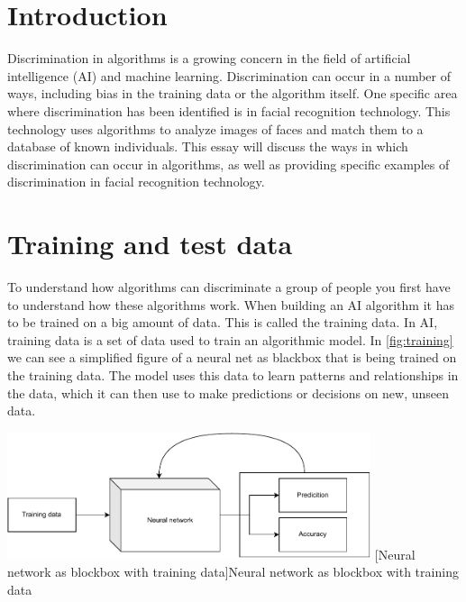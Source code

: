 \documentclass[
	12pt,
    a4paper,
    egregdoesnotlikesansseriftitles, %
    toc=chapterentrywithdots,
    oneside, openany,
    titlepage,
    parskip=half,
    headings=normal,  %
    listof=totoc,
    bibliography=totocnumbered,
    index=totoc,
    captions=tableheading,  %
    listof=flat,
    numbers=noenddot, %
    final]
    {scrbook}
\begin{document}
\setcounter{secnumdepth}{3}  %
\setcounter{tocdepth}{2}  %


\frontmatter


\tableofcontents

\listoffigures
\clearpage %

\listoftables
\clearpage %

\renewcommand{\lstlistlistingname}{List of Listings}  %
\clearpage %

\mainmatter

\chapter{Introduction}
Discrimination in algorithms is a growing concern in the field of artificial intelligence (AI) and machine learning. 
Discrimination can occur in a number of ways, including bias in the training data or the algorithm itself. 
One specific area where discrimination has been identified is in facial recognition technology. This technology uses algorithms to analyze images of faces and match them to a database of known individuals.
This essay will discuss the ways in which discrimination can occur in algorithms, as well as providing specific examples of discrimination in facial recognition technology.

\chapter{Training and test data}
To understand how algorithms can discriminate a group of people you first have to understand how these algorithms work. 
When building an AI algorithm it has to be trained on a big amount of data. 
This is called the training data. 
In AI, training data is a set of data used to train an algorithmic model. 
In \ref{fig:training} we can see a simplified figure of a neural net as blackbox that is being trained on the training data.
The model uses this data to learn patterns and relationships in the data, which it can then use to make predictions or decisions on new, unseen data. 

\vspace{1em}
\begin{minipage}{\linewidth}
	\centering
	\includegraphics[width=0.8\textwidth]{figures/training.pdf}
	[Neural network as blockbox with training data]{Neural network as blockbox with training data}
	\label{fig:training}
\end{minipage}
\end{document}
